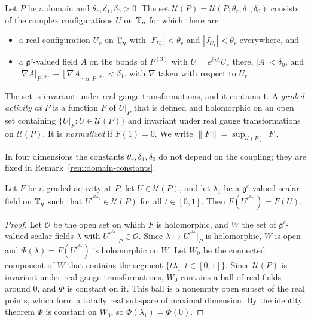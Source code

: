 \begin{definition}\label{def:graded}
Let $P$ be a domain and $\theta_r,\delta_1,\delta_0>0$. The set $\mathcal U(P)=\mathcal U(P;\theta_r,\delta_1,\delta_0)$ consists of the complex configurations $U$ on $\mathbb T_\eta$ for which there are
\begin{itemize}
\item a real configuration $U_r$ on $\mathbb T_\eta$ with $|F_{U_r}|<\theta_r$ and $|J_{U_r}|<\theta_r$ everywhere, and
\item a $\mathfrak g^c$-valued field $A$ on the bonds of $P^{(3)}$ with $U=e^{\ii\eta A}U_r$ there, $|A|<\delta_0$, and $|\nabla A|_{P^{(3)}}+[\nabla A]_{\alpha,P^{(3)}}<\delta_1$, with $\nabla$ taken with respect to $U_r$.
\end{itemize}
The set is invariant under real gauge transformations, and it contains $1$. A \emph{graded activity at $P$} is a function $F$ of $U|_P$ that is defined and holomorphic on an open set containing $\{U|_P:U\in\mathcal U(P)\}$ and invariant under real gauge transformations on $\mathcal U(P)$. It is \emph{normalized} if $F(1)=0$. We write $\|F\|=\sup_{\mathcal U(P)}|F|$.
\end{definition}

In four dimensions the constants $\theta_r,\delta_1,\delta_0$ do not depend on the coupling; they are fixed in Remark~\ref{rem:domain-constants}.

\begin{lemma}\label{lem:complex-gauge}
Let $F$ be a graded activity at $P$, let $U\in\mathcal U(P)$, and let $\lambda_1$ be a $\mathfrak g^c$-valued scalar field on $\mathbb T_\eta$ such that $U^{e^{\ii t\lambda_1}}\in\mathcal U(P)$ for all $t\in[0,1]$. Then $F(U^{e^{\ii\lambda_1}})=F(U)$.
\end{lemma}

\begin{proof}
Let $\mathcal O$ be the open set on which $F$ is holomorphic, and $W$ the set of $\mathfrak g^c$-valued scalar fields $\lambda$ with $U^{e^{\ii\lambda}}|_P\in\mathcal O$. Since $\lambda\mapsto U^{e^{\ii\lambda}}|_P$ is holomorphic, $W$ is open and $\Phi(\lambda)=F(U^{e^{\ii\lambda}})$ is holomorphic on $W$. Let $W_0$ be the connected component of $W$ that contains the segment $\{t\lambda_1:t\in[0,1]\}$. Since $\mathcal U(P)$ is invariant under real gauge transformations, $W_0$ contains a ball of real fields around $0$, and $\Phi$ is constant on it. This ball is a nonempty open subset of the real points, which form a totally real subspace of maximal dimension. By the identity theorem $\Phi$ is constant on $W_0$, so $\Phi(\lambda_1)=\Phi(0)$.
\end{proof}

